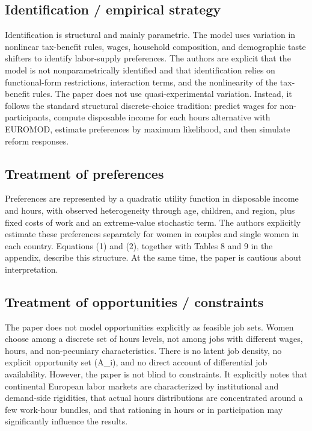 \documentclass[11pt,a4paper]{article}
\begin{document}
\subsection*{Identification / empirical strategy}
Identification is structural and mainly parametric. The model uses variation in nonlinear tax-benefit rules, wages, household composition, and demographic taste shifters to identify labor-supply preferences. The authors are explicit that the model is not nonparametrically identified and that identification relies on functional-form restrictions, interaction terms, and the nonlinearity of the tax-benefit rules. The paper does not use quasi-experimental variation. Instead, it follows the standard structural discrete-choice tradition: predict wages for non-participants, compute disposable income for each hours alternative with EUROMOD, estimate preferences by maximum likelihood, and then simulate reform responses.

\subsection*{Treatment of preferences}
Preferences are represented by a quadratic utility function in disposable income and hours, with observed heterogeneity through age, children, and region, plus fixed costs of work and an extreme-value stochastic term. The authors explicitly estimate these preferences separately for women in couples and single women in each country. Equations (1) and (2), together with Tables 8 and 9 in the appendix, describe this structure. At the same time, the paper is cautious about interpretation.

\subsection*{Treatment of opportunities / constraints}
The paper does not model opportunities explicitly as feasible job sets. Women choose among a discrete set of hours levels, not among jobs with different wages, hours, and non-pecuniary characteristics. There is no latent job density, no explicit opportunity set (A\_i), and no direct account of differential job availability. However, the paper is not blind to constraints. It explicitly notes that continental European labor markets are characterized by institutional and demand-side rigidities, that actual hours distributions are concentrated around a few work-hour bundles, and that rationing in hours or in participation may significantly influence the results.
\end{document}
